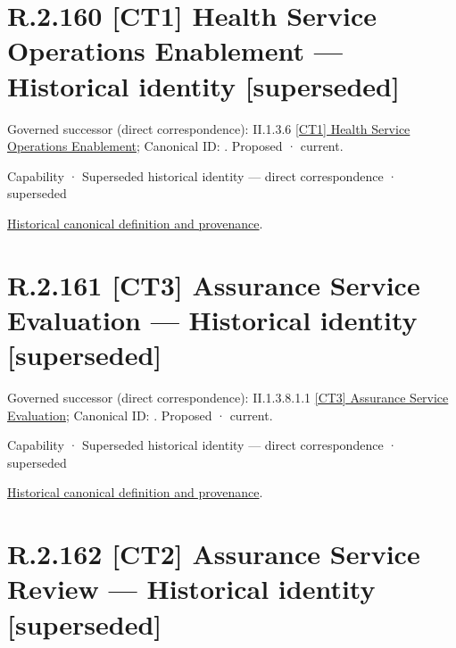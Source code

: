 \section*{R.2.160 [CT1] Health Service Operations Enablement — Historical identity [superseded]}
\label{navigation:R.2.160}

{\small Governed successor (direct correspondence): II.1.3.6 \hyperref[element:b13ee2c5a4ef4fd6be8a44795696dfc2]{[CT1] Health Service Operations Enablement}; Canonical ID: \texttt{}. Proposed · current.}\par
\label{element:a98424298dac46d8b2ddd109d928270a}
{\small Capability · Superseded historical identity — direct correspondence · superseded}\par
\href{../../../../continuum/strategy/capability/a98424298dac46d8b2ddd109d928270a.md}{Historical canonical definition and provenance}.\par
\section*{R.2.161 [CT3] Assurance Service Evaluation — Historical identity [superseded]}
\label{navigation:R.2.161}

{\small Governed successor (direct correspondence): II.1.3.8.1.1 \hyperref[element:039343518db542d48cde6afab84a3e1e]{[CT3] Assurance Service Evaluation}; Canonical ID: \texttt{}. Proposed · current.}\par
\label{element:be34b54314c6444f8418d645f6c83b6d}
{\small Capability · Superseded historical identity — direct correspondence · superseded}\par
\href{../../../../continuum/strategy/capability/be34b54314c6444f8418d645f6c83b6d.md}{Historical canonical definition and provenance}.\par
\section*{R.2.162 [CT2] Assurance Service Review — Historical identity [superseded]}
\label{navigation:R.2.162}

